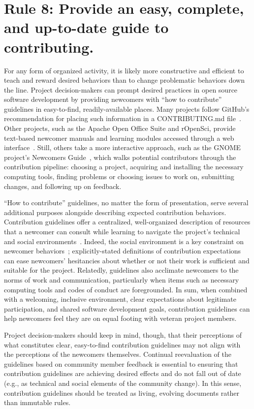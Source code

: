 \documentclass[10pt,letterpaper]{article}
\newcommand{\rulemajor}[1]{\section{#1}}
\begin{document}
\rulemajor{Rule 8: Provide an easy, complete, and up-to-date guide to contributing.}

For any form of organized activity,
it is likely more constructive and efficient to teach and reward desired behaviors than to change problematic behaviors down the line.
Project decision-makers can prompt desired practices in open source software development
by providing newcomers with ``how to contribute'' guidelines in easy-to-find, readily-available places.
Many projects follow GitHub's recommendation for placing such information in a CONTRIBUTING.md file~\cite{github-rec}.
Other projects,
such as the Apache Open Office Suite and rOpenSci,
provide text-based newcomer manuals and learning modules accessed through a web interface~\cite{apache-guidelines,ropensci-guidelines}.
Still, others take a more interactive approach,
such as the GNOME project's Newcomers Guide~\cite{gnome-newcomers},
which walks potential contributors through the contribution pipeline:
choosing a project,
acquiring and installing the necessary computing tools,
finding problems or choosing issues to work on,
submitting changes,
and following up on feedback.

``How to contribute'' guidelines,
no matter the form of presentation,
serve several additional purposes alongside describing expected contribution behaviors.
Contribution guidelines offer a centralized, well-organized description of resources
that a newcomer can consult while learning to navigate the project's technical and social environments~\cite{zanatta2017}.
Indeed, the social environment is a key constraint on newcomer behaviors~\cite{steinmacher2015};
explicitly-stated definitions of contribution expectations can ease newcomers' hesitancies
about whether or not their work is sufficient and suitable for the project.
Relatedly,
guidelines also acclimate newcomers to the norms of work and communication,
particularly when items such as necessary computing tools and codes of conduct are foregrounded.
In sum,
when combined with a welcoming, inclusive environment,
clear expectations about legitimate participation,
and shared software development goals,
contribution guidelines can help newcomers feel they are on equal footing with veteran project members.

Project decision-makers should keep in mind,
though,
that their perceptions of what constitutes clear, easy-to-find contribution guidelines
may not align with the perceptions of the newcomers themselves.
Continual reevaluation of the guidelines based on community member feedback is essential
to ensuring that contribution guidelines are achieving desired effects
and do not fall out of date (e.g., as technical and social elements of the community change).
In this sense,
contribution guidelines should be treated as living, evolving documents rather than immutable rules.
\end{document}
